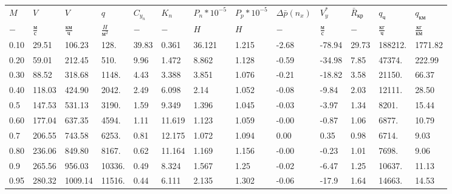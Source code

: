 \begin{tabular}{lllllllllllll}
$M$ & $V$ & $V$ & $q$ & $C_{y_n}$ & $K_n$ & $P_n*10^{-5}$ & $P_p*10^{-5}$ & $\Delta \bar{p}(n_x)$ & $V_y^*$ & $\bar{R}_{кр}$ & $q_{ч}$ & $q_{км}$ \\
$-$ & $\frac{м}{с}$ & $\frac{км}{ч}$ & $\frac{H}{м^2}$ & $-$ & $-$ & $H$ & $H$ & $-$ & $\frac{м}{с}$ & $-$ & $\frac{кг}{ч}$ & $\frac{кг}{км}$ \\
0.10 & 29.51 & 106.23 & 128. & 39.83 & 0.361 & 36.121 & 1.215 & -2.68 & -78.94 & 29.73 & 188212. & 1771.82 \\
0.20 & 59.01 & 212.45 & 510. & 9.96 & 1.472 & 8.862 & 1.128 & -0.59 & -34.98 & 7.85 & 47374. & 222.99 \\
0.30 & 88.52 & 318.68 & 1148. & 4.43 & 3.388 & 3.851 & 1.076 & -0.21 & -18.82 & 3.58 & 21150. & 66.37 \\
0.40 & 118.03 & 424.90 & 2042. & 2.49 & 6.098 & 2.14 & 1.052 & -0.08 & -9.84 & 2.03 & 12111. & 28.50 \\
0.5 & 147.53 & 531.13 & 3190. & 1.59 & 9.349 & 1.396 & 1.045 & -0.03 & -3.97 & 1.34 & 8201. & 15.44 \\
0.60 & 177.04 & 637.35 & 4594. & 1.11 & 11.619 & 1.123 & 1.059 & -0.00 & -0.87 & 1.06 & 6877. & 10.79 \\
0.7 & 206.55 & 743.58 & 6253. & 0.81 & 12.175 & 1.072 & 1.094 & 0.00 & 0.35 & 0.98 & 6714. & 9.03 \\
0.80 & 236.06 & 849.80 & 8167. & 0.62 & 11.164 & 1.169 & 1.156 & -0.00 & -0.23 & 1.01 & 7698. & 9.06 \\
0.9 & 265.56 & 956.03 & 10336. & 0.49 & 8.324 & 1.567 & 1.25 & -0.02 & -6.47 & 1.25 & 10637. & 11.13 \\
0.95 & 280.32 & 1009.14 & 11516. & 0.44 & 6.111 & 2.135 & 1.302 & -0.06 & -17.9 & 1.64 & 14663. & 14.53 \\
\end{tabular}
